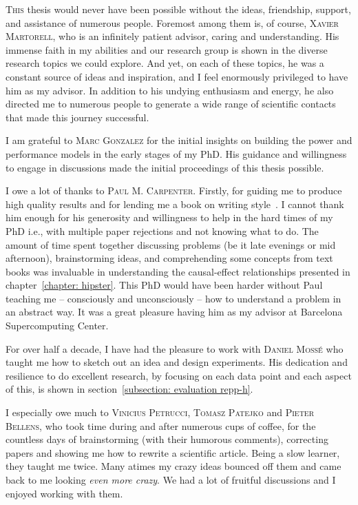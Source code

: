 \begin{acknowledgements}      

    \newcommand{\tnk}{\textsc}

     \lettrine{T}{his} thesis would never have been possible without the
    ideas, friendship, support, and assistance of numerous people. Foremost among them is,
    of course, \tnk{Xavier Martorell}, who is an infinitely patient advisor, caring and
    understanding. His immense faith in my abilities and our research group is shown in
    the diverse research topics we could explore. And yet, on each of these topics, he was
    a constant source of ideas and inspiration, and I feel enormously privileged to have
    him as my advisor. In addition to his undying enthusiasm and energy, he also directed
    me to numerous people to generate a wide range of scientific contacts that made this
    journey successful.
    
     I am grateful to \tnk{Marc Gonzalez} for the initial insights on
    building the power and performance models in the early stages of my PhD.  His guidance
    and willingness to engage in discussions made the initial proceedings of this thesis
    possible. 
    
     I  owe a lot of thanks to \tnk{Paul M. Carpenter}. Firstly, for guiding
    me to produce high quality results and for lending me a book on writing
    style~\citep{paulbook}. I cannot thank him enough for his generosity and willingness
    to help in the hard times of my PhD i.e., with multiple paper rejections and not knowing
    what to do.  The amount of time spent together discussing problems (be it late
    evenings or mid afternoon), brainstorming ideas, and comprehending some concepts from
    text books was invaluable in understanding the causal-effect relationships presented
    in chapter~\ref{chapter: hipster}. This PhD would have been harder without Paul
    teaching me -- consciously and unconsciously -- how to understand a problem in an
    abstract way.  It was a great pleasure having him as my advisor at Barcelona
    Supercomputing Center.
    
    For over half a decade, I have had the pleasure to work with \tnk{Daniel Moss\'e} who
    taught me how to sketch out an idea and design experiments. His dedication and
    resilience to do excellent research, by focusing on each data point and each aspect of
    this, is shown in section~\ref{subsection: evaluation repp-h}.
    
     I especially owe much to \tnk{Vinicius Petrucci},  \tnk{Tomasz Patejko}
    and \tnk{Pieter Bellens}, who took time during and after numerous cups of coffee, for
    the countless days of brainstorming (with their humorous comments), correcting papers
    and showing me how to rewrite a scientific article.  Being a slow learner, they taught
    me twice.  Many atimes my crazy ideas bounced off them and came back to me looking
    \emph{even more crazy}. We had a lot of fruitful discussions and I enjoyed working
    with them.
    

\end{acknowledgements}
